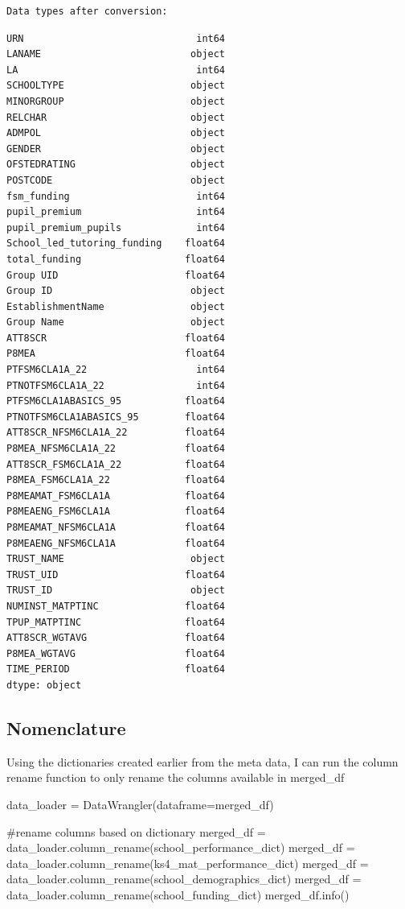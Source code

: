 \documentclass[
  letterpaper,
  DIV=11,
  numbers=noendperiod]{scrartcl}
\newenvironment{Shaded}{\begin{snugshade}}{\end{snugshade}}
\newcommand{\CommentTok}[1]{\textcolor[rgb]{0.37,0.37,0.37}{#1}}
\newcommand{\NormalTok}[1]{\textcolor[rgb]{0.00,0.23,0.31}{#1}}
\newcommand{\OperatorTok}[1]{\textcolor[rgb]{0.37,0.37,0.37}{#1}}
\begin{document}
\begin{verbatim}
Data types after conversion:
\end{verbatim}

\begin{verbatim}
URN                              int64
LANAME                          object
LA                               int64
SCHOOLTYPE                      object
MINORGROUP                      object
RELCHAR                         object
ADMPOL                          object
GENDER                          object
OFSTEDRATING                    object
POSTCODE                        object
fsm_funding                      int64
pupil_premium                    int64
pupil_premium_pupils             int64
School_led_tutoring_funding    float64
total_funding                  float64
Group UID                      float64
Group ID                        object
EstablishmentName               object
Group Name                      object
ATT8SCR                        float64
P8MEA                          float64
PTFSM6CLA1A_22                   int64
PTNOTFSM6CLA1A_22                int64
PTFSM6CLA1ABASICS_95           float64
PTNOTFSM6CLA1ABASICS_95        float64
ATT8SCR_NFSM6CLA1A_22          float64
P8MEA_NFSM6CLA1A_22            float64
ATT8SCR_FSM6CLA1A_22           float64
P8MEA_FSM6CLA1A_22             float64
P8MEAMAT_FSM6CLA1A             float64
P8MEAENG_FSM6CLA1A             float64
P8MEAMAT_NFSM6CLA1A            float64
P8MEAENG_NFSM6CLA1A            float64
TRUST_NAME                      object
TRUST_UID                      float64
TRUST_ID                        object
NUMINST_MATPTINC               float64
TPUP_MATPTINC                  float64
ATT8SCR_WGTAVG                 float64
P8MEA_WGTAVG                   float64
TIME_PERIOD                    float64
dtype: object
\end{verbatim}

\subsection{Nomenclature}\label{nomenclature}

Using the dictionaries created earlier from the meta data, I can run the
column rename function to only rename the columns available in
merged\_df

\begin{Shaded}
\begin{Highlighting}[]

\NormalTok{data\_loader }\OperatorTok{=}\NormalTok{ DataWrangler(dataframe}\OperatorTok{=}\NormalTok{merged\_df)}

\CommentTok{\#rename columns based on dictionary}
\NormalTok{merged\_df }\OperatorTok{=}\NormalTok{ data\_loader.column\_rename(school\_performance\_dict)}
\NormalTok{merged\_df }\OperatorTok{=}\NormalTok{ data\_loader.column\_rename(ks4\_mat\_performance\_dict)}
\NormalTok{merged\_df }\OperatorTok{=}\NormalTok{ data\_loader.column\_rename(school\_demographics\_dict)}
\NormalTok{merged\_df }\OperatorTok{=}\NormalTok{ data\_loader.column\_rename(school\_funding\_dict)}
\NormalTok{merged\_df.info()}
\end{Highlighting}
\end{Shaded}
\end{document}
